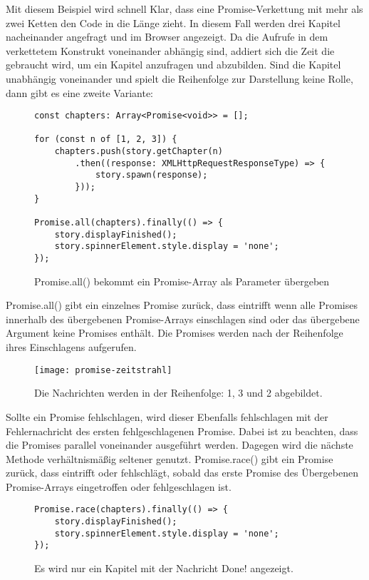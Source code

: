 \noindent
Mit diesem Beispiel wird schnell Klar, dass eine Promise-Verkettung mit mehr als zwei Ketten den Code in die Länge zieht. In diesem Fall werden drei Kapitel nacheinander angefragt und im Browser angezeigt. Da die Aufrufe in dem verkettetem Konstrukt voneinander abhängig sind, addiert sich die Zeit die gebraucht wird, um ein Kapitel anzufragen und abzubilden. Sind die Kapitel unabhängig voneinander und spielt die Reihenfolge zur Darstellung keine Rolle, dann gibt es eine zweite Variante: 

\begin{figure}[H]
\begin{lstlisting}
const chapters: Array<Promise<void>> = [];

for (const n of [1, 2, 3]) {
    chapters.push(story.getChapter(n)
        .then((response: XMLHttpRequestResponseType) => {
            story.spawn(response);
        }));
}

Promise.all(chapters).finally(() => {
    story.displayFinished();
    story.spinnerElement.style.display = 'none';
});
\end{lstlisting}
\caption{Promise.all() bekommt ein Promise-Array als Parameter übergeben}
\end{figure}

\noindent
Promise.all() gibt ein einzelnes Promise zurück, dass eintrifft wenn alle Promises innerhalb des übergebenen Promise-Arrays einschlagen sind oder das übergebene Argument keine Promises enthält. Die Promises werden nach der Reihenfolge ihres Einschlagens aufgerufen.

\begin{figure}[H]
\centering
\texttt{[image: promise-zeitstrahl]}
\caption{Die Nachrichten werden in der Reihenfolge: 1, 3 und 2 abgebildet.}
\end{figure}

\noindent
Sollte ein Promise fehlschlagen, wird dieser Ebenfalls fehlschlagen mit der Fehlernachricht des ersten fehlgeschlagenen Promise.\cite{promise-executor} Dabei ist zu beachten, dass die Promises parallel voneinander ausgeführt werden. Dagegen wird die nächste Methode verhältnismäßig seltener genutzt. Promise.race() gibt ein Promise zurück, dass eintrifft oder fehlschlägt, sobald das erste Promise des Übergebenen Promise-Arrays eingetroffen oder fehlgeschlagen ist.\cite{versprechen}

\begin{figure}[H]
\begin{lstlisting}
Promise.race(chapters).finally(() => {
    story.displayFinished();
    story.spinnerElement.style.display = 'none';
});
\end{lstlisting}
\caption{Es wird nur ein Kapitel mit der Nachricht \glqq Done!\grqq{} angezeigt.}
\end{figure}

